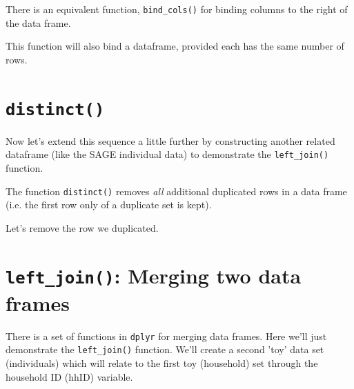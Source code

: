 \documentclass[titlepage]{book}\usepackage{knitr}
\begin{document}
There is an equivalent function, \texttt{bind\_cols()} for binding columns to the right of the data frame.

This function will also bind a dataframe, provided each has the same number of rows.
\begin{knitrout}
\color{fgcolor}\begin{kframe}
\begin{alltt}
 \hlkwb{<-} \hlstd{(hhDf,hhDf[}\hlstd{,])}    
\end{alltt}
\end{kframe}
\end{knitrout}

\section{\texttt{distinct()}} \label{dplyrDistinct}

Now let's extend this sequence a little further by constructing another related dataframe (like the SAGE individual data) to demonstrate the \texttt{left\_join()} function.

The function \texttt{distinct()} removes \textsl{all} additional duplicated rows in a data frame (i.e. the first row only of a duplicate set is kept).

Let's remove the row we duplicated.
\begin{knitrout}
\color{fgcolor}\begin{kframe}
\begin{alltt}
 \hlkwb{<-}     
\end{alltt}
\end{kframe}
\end{knitrout}


\section{\texttt{left\_join()}: Merging two data frames}\label{merging2DFs} 

There is a set of functions in \texttt{dplyr} for merging data frames. Here we'll just demonstrate the \texttt{left\_join()} function. We'll create a second 'toy' data set (individuals) which will relate to the first toy (household) set through the household ID (hhID) variable.
\end{document}
